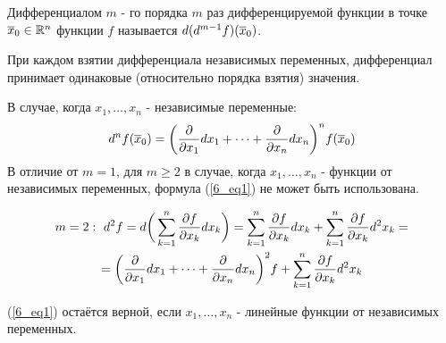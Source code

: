 \begin{definition}
	Дифференциалом $m$ - го порядка $m$ раз дифференцируемой функции в точке $\overline x_0\in\mathbb{R}^n$ функции $f$ называется $d(d^{m-1}f)(\overline x_0)$.
\end{definition}
\begin{note}
	При каждом взятии дифференциала независимых переменных, дифференциал принимает одинаковые (относительно порядка взятия) значения.
\end{note}
\begin{note}
	В случае, когда $x_1,\dots,x_n$ - независимые переменные:
	\begin{equation}\label{6_eq1}
		d^nf(\overline x_0)=\bigg(\frac{\partial}{\partial x_1}dx_1+\dots+\frac{\partial}{\partial x_n}dx_n\bigg)^nf(\overline x_0)
	\end{equation}
	В отличие от $m=1$, для $m\ge2$ в случае, когда $x_1,\dots,x_n$ - функции от независимых переменных, формула (\ref{6_eq1}) не может быть использована.
\end{note}
\begin{example}
	\begin{multline*}
		m=2:\ d^2f=d\bigg(\sum_{k=1}^n\frac{\vd f}{\vd x_k}dx_k\bigg)=
		\sum_{k=1}^n\frac{\vd f}{\vd x_k}dx_k+\sum_{k=1}^n\frac{\vd f}{\vd x_k}d^2x_k=\\
		=\bigg(\frac{\vd}{\vd x_1}dx_1+\dots+\frac{\vd}{\vd x_n}dx_n\bigg)^2f+\sum_{k=1}^n\frac{\vd f}{\vd x_k}d^2x_k
	\end{multline*}
\end{example}
\begin{note}
	(\ref{6_eq1}) остаётся верной, если $x_1,\dots,x_n$ - линейные функции от независимых переменных.
\end{note}
